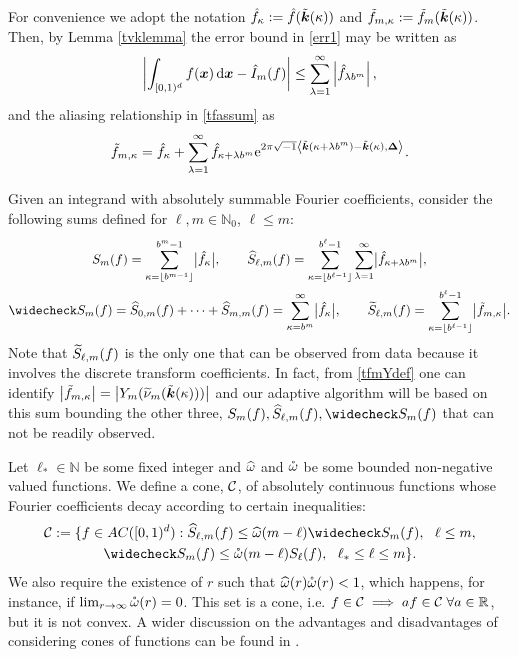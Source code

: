 \documentclass[graybox]{svmult}
\newcommand{\R}{\mathbb{R}} %
\newcommand{\N}{\mathbb{N}} %
\newcommand{\bsx}{\boldsymbol{x}}    %
\newcommand{\bsDelta}{\boldsymbol{\Delta}}    %
\begin{document}
For convenience we adopt the notation $\hat{f}_{\kappa} :=\hat{f}(\tilde{\boldsymbol{k}}(\kappa))$ and $\tilde{f}_{m,\kappa} := \tilde{f}_m(\tilde{\boldsymbol{k}}(\kappa))$. Then, by Lemma  \ref{tvklemma} the error bound in \eqref{err1} may be written as
\begin{equation}
\biggabs{ \int_{\cube} f(\bsx) \, \D \bsx - \hI_m(f)} 
\le \sum_{\lambda=1}^{\infty} \left \lvert \hf_{\lambda b^m}\right \rvert, \label{err2}
\end{equation}
and the aliasing relationship in \eqref{tfassum} as
\begin{align}
\tf_{m,\kappa} =\hf_{\kappa} + \sum_{\lambda=1}^{\infty} \hf_{\kappa+\lambda b^{m}} \E^{2 \pi \sqrt{-1} \ip{\tvk(\kappa+\lambda b^{m}) - \tvk(\kappa)}{\bsDelta}}. \label{tfassumc}
\end{align}

Given an integrand with absolutely summable Fourier coefficients, consider the following sums defined for $\ell,m \in \N_0$, $\ell \le m$:
\begin{gather*}
S_m(f) =  \sum_{\kappa=\left \lfloor b^{m-1} \right \rfloor}^{b^{m}-1} \bigabs{\hf_{\kappa}}, \qquad 
\hS_{\ell,m}(f)  = \sum_{\kappa=\left \lfloor b^{\ell-1} \right \rfloor}^{b^{\ell}-1} \sum_{\lambda=1}^{\infty} \bigabs{ \hf_{\kappa+\lambda b^{m}}}, \\
\wcS_m(f)=\hS_{0,m}(f) + \cdots + \hS_{m,m}(f)=
\sum_{\kappa=b^{m}}^{\infty} \bigabs{\hf_{\kappa}}, \qquad
\tS_{\ell,m}(f) = \sum_{\kappa=\left \lfloor b^{\ell-1}\right \rfloor}^{b^{\ell}-1} \bigabs{\tf_{m,\kappa}}.
\end{gather*}
Note that $\widetilde{S}_{\ell,m}(f)$ is the only one that can be observed from data because it involves the discrete transform coefficients. In fact, from \eqref{tfmYdef} one can identify $\bigl \lvert \tilde{f}_{m,\kappa} \bigr \rvert = \bigl \lvert Y_m(\widetilde{\nu}_m(\tilde{\boldsymbol{k}}(\kappa))) \bigr \rvert$ and our adaptive algorithm will be based on this sum bounding the other three, $S_m(f),\hS_{\ell,m}(f),\wcS_m(f)$ that can not be readily observed. 

Let  $\ell_* \in \N$ be some fixed integer and $\widehat{\omega}$ and $\mathring{\omega}$ be some bounded non-negative valued functions.  We define a cone, $\mathcal{C}$, of absolutely continuous functions whose Fourier coefficients decay according to certain inequalities:
\begin{multline} \label{conecond}
\cc:=\{f \in AC(\cube) : \hS_{\ell,m}(f) \le \homega(m-\ell) \wcS_m(f),\ \ \ell \le m, \\
\wcS_m(f) \le \wcomega(m-\ell) S_{\ell}(f),\ \  \ell_* \le \ell \le m\}.
\end{multline}
We also require the existence of $r$ such that $\widehat{\omega}(r) \mathring{\omega}(r)<1$, which happens, for instance, if $\lim_{r\rightarrow\infty}\mathring{\omega}(r)=0$. This set is a cone, i.e. $f \in \cc \implies af \in \cc\;\forall a\in\R$, but it is not convex. A wider discussion on the advantages and disadvantages of considering cones of functions can be found in \cite{Clancy201421}.
\end{document}
